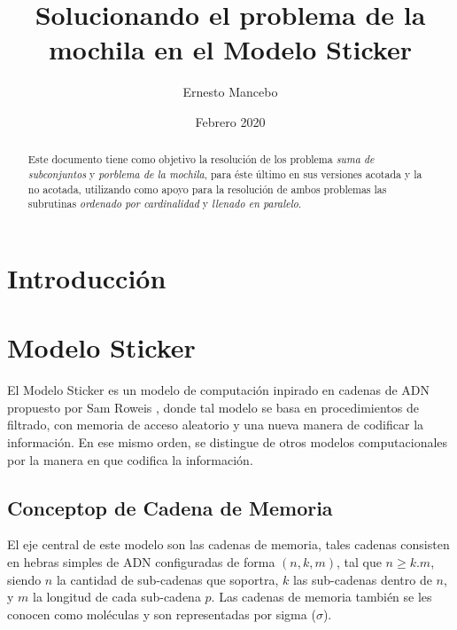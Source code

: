\documentclass[12pt, letterpaper, twoside]{article}
\title{Solucionando el problema de la mochila en el Modelo Sticker}
\author{Ernesto Mancebo}
\date{Febrero 2020}
\begin{document}
    \maketitle
    \begin{abstract}
        Este documento tiene como objetivo la resolución de los problema \emph{suma de subconjuntos} y \emph{porblema de la mochila}, para éste último en sus versiones acotada y la no acotada, utilizando como apoyo para la resolución de ambos problemas las subrutinas \emph{ordenado por cardinalidad} y \emph{llenado en paralelo}.
    \end{abstract}

    \newpage
    \section{Introducción}

    \section{Modelo Sticker}
    El Modelo Sticker es un modelo de computación inpirado en cadenas de ADN propuesto por Sam Roweis \textcolor{red}{\cite{article}}, donde tal modelo se basa en procedimientos de filtrado, con memoria de acceso aleatorio y una nueva manera de codificar la información. En ese mismo orden, se distingue de otros modelos computacionales por la manera en que codifica la información.

    \subsection{Conceptop de Cadena de Memoria}

    El eje central de este modelo son las cadenas de memoria, tales cadenas consisten en hebras simples de ADN configuradas de forma $(n, k, m)$, tal que $n\geq k.m$, siendo $n$ la cantidad de sub-cadenas que soportra, $k$ las sub-cadenas dentro de $n$, y $m$ la longitud de cada sub-cadena $p$. Las cadenas de memoria también se les conocen como moléculas y son representadas por sigma ($\sigma$). \\
\end{document}
